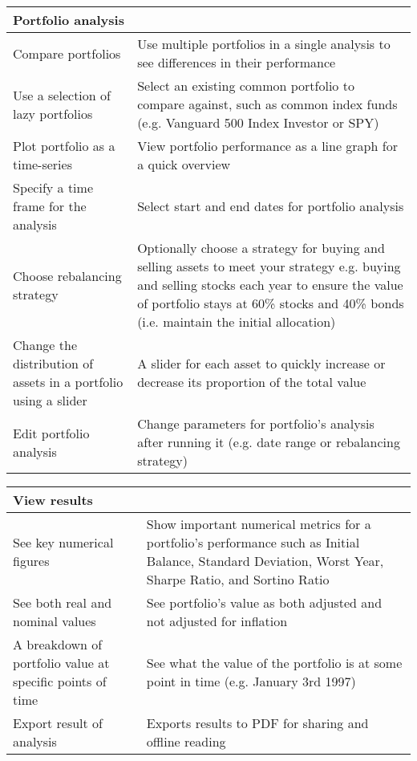 \documentclass[main.tex]{subfiles}
\begin{document}
{
\setlength{\tabcolsep}{30pt}
\renewcommand{\arraystretch}{2}
\centering
{}
\begin{tabularx}{\linewidth}{|X|X|}
\hline
 \textbf{Portfolio analysis}  &  \\
 \hline
 Compare portfolios & Use multiple portfolios in a single analysis to see differences in their performance \\
\hline
Use a selection of lazy portfolios & Select an existing common portfolio to compare against, such as common index funds (e.g. Vanguard 500 Index Investor or SPY) \\
\hline
Plot portfolio as a time-series & View portfolio performance as a line graph for a quick overview \\
\hline
Specify a time frame for the analysis & Select start and end dates for portfolio analysis \\
\hline
Choose rebalancing strategy & Optionally choose a strategy for buying and selling assets to meet your strategy e.g. buying and selling stocks each year to ensure the value of portfolio stays at 60\% stocks and 40\% bonds (i.e. maintain the initial allocation) \\
\hline
Change the distribution of assets in a portfolio using a slider & A slider for each asset to quickly increase or decrease its proportion of the total value \\
\hline
Edit portfolio analysis & Change parameters for portfolio's analysis after running it (e.g. date range or rebalancing strategy) \\
\hline
\end{tabularx}
}

\vspace{0.5cm}

{
\setlength{\tabcolsep}{30pt}
\renewcommand{\arraystretch}{2}
\centering
{}
\begin{tabularx}{\linewidth}{|X|X|}
\hline
 \textbf{View results}  &  \\
 \hline
 See key numerical figures & Show important numerical metrics for a portfolio's performance such as Initial Balance, Standard Deviation, Worst Year, Sharpe Ratio, and Sortino Ratio \\
\hline
See both real and nominal values & See portfolio's value as both adjusted and not adjusted for inflation \\
\hline
A breakdown of portfolio value at specific points of time & See what the value of the portfolio is at some point in time (e.g. January 3rd 1997) \\
\hline
Export result of analysis & Exports results to PDF for sharing and offline reading \\
\hline
\end{tabularx}
}
\end{document}

